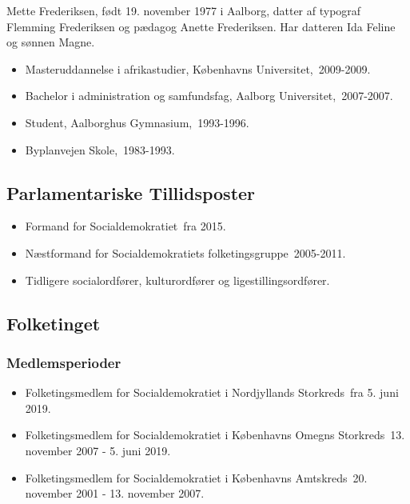 \documentclass[11pt, a4paper]{awesome-cv}
\begin{document}
\makecvheader[R]
\makelettertitle
\begin{cvletter}
Mette Frederiksen, født 19. november 1977 i Aalborg, datter af typograf Flemming Frederiksen og pædagog Anette Frederiksen. Har datteren Ida Feline og sønnen Magne.

\begin{itemize}
\item Masteruddannelse i afrikastudier, Københavns Universitet, 2009-2009.
\item Bachelor i administration og samfundsfag, Aalborg Universitet, 2007-2007.
\item Student, Aalborghus Gymnasium, 1993-1996.
\item Byplanvejen Skole, 1983-1993.
\end{itemize}
\subsection*{Parlamentariske Tillidsposter}
\begin{itemize}
\item Formand for Socialdemokratiet fra 2015.
\item Næstformand for Socialdemokratiets folketingsgruppe 2005-2011.
\item Tidligere socialordfører, kulturordfører og ligestillingsordfører.
\end{itemize}
\subsection*{Folketinget}
\subsubsection*{Medlemsperioder}
\begin{itemize}
\item Folketingsmedlem for Socialdemokratiet i Nordjyllands Storkreds fra 5. juni 2019.
\item Folketingsmedlem for Socialdemokratiet i Københavns Omegns Storkreds 13. november 2007 - 5. juni 2019.
\item Folketingsmedlem for Socialdemokratiet i Københavns Amtskreds 20. november 2001 - 13. november 2007.
\end{itemize}

\end{cvletter}
\end{document}
